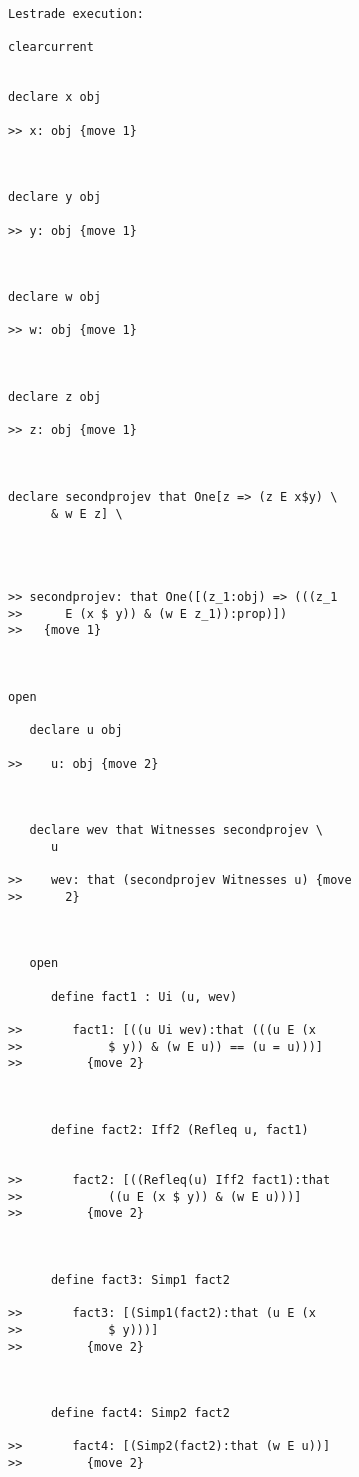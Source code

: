 \documentclass[12pt]{article}
\begin{document}
\begin{verbatim}Lestrade execution:

clearcurrent


declare x obj

>> x: obj {move 1}



declare y obj

>> y: obj {move 1}



declare w obj

>> w: obj {move 1}



declare z obj

>> z: obj {move 1}



declare secondprojev that One[z => (z E x$y) \
      & w E z] \
   



>> secondprojev: that One([(z_1:obj) => (((z_1
>>      E (x $ y)) & (w E z_1)):prop)])
>>   {move 1}



open

   declare u obj

>>    u: obj {move 2}



   declare wev that Witnesses secondprojev \
      u

>>    wev: that (secondprojev Witnesses u) {move
>>      2}



   open

      define fact1 : Ui (u, wev)

>>       fact1: [((u Ui wev):that (((u E (x
>>            $ y)) & (w E u)) == (u = u)))]
>>         {move 2}



      define fact2: Iff2 (Refleq u, fact1)


>>       fact2: [((Refleq(u) Iff2 fact1):that
>>            ((u E (x $ y)) & (w E u)))]
>>         {move 2}



      define fact3: Simp1 fact2

>>       fact3: [(Simp1(fact2):that (u E (x
>>            $ y)))]
>>         {move 2}



      define fact4: Simp2 fact2

>>       fact4: [(Simp2(fact2):that (w E u))]
>>         {move 2}




\end{verbatim}
\end{document}
